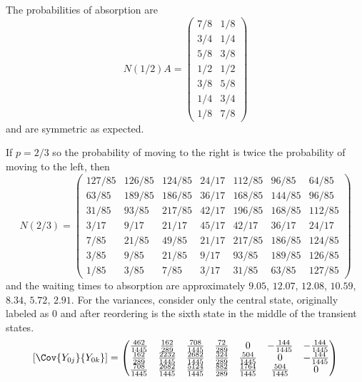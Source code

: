 \documentclass[12pt]{article}
\begin{document}
\begin{example}
    The probabilities of absorption are
    \[
        N(1/2) A =
        \begin{pmatrix}
            7/8 & 1/8\\
            3/4 & 1/4\\
            5/8 & 3/8\\
            1/2 & 1/2\\
            3/8 & 5/8\\
            1/4 & 3/4\\
            1/8 & 7/8
        \end{pmatrix}
    \] and are symmetric as expected.

    If \( p = 2/3 \) so the probability of moving to the right is twice
    the probability of moving to the left, then
    \[
        N(2/3) =
        \begin{pmatrix}
            127/85 & 126/85 & 124/85 & 24/17 & 112/85 & 96/85 & 64/85\\
            63/85 & 189/85 & 186/85 & 36/17 & 168/85 & 144/85 & 96/85\\
            31/85 & 93/85 & 217/85 & 42/17 & 196/85 & 168/85 & 112/85\\
            3/17 & 9/17 & 21/17 & 45/17 & 42/17 & 36/17 & 24/17\\
            7/85 & 21/85 & 49/85 & 21/17 & 217/85 & 186/85 & 124/85\\
            3/85 & 9/85 & 21/85 & 9/17 & 93/85 & 189/85 & 126/85\\
            1/85 & 3/85 & 7/85 & 3/17 & 31/85 & 63/85 & 127/85
        \end{pmatrix}
    \] and the waiting times to absorption are approximately \( 9.05 \),
    \( 12.07 \), \( 12.08 \), \( 10.59 \), \( 8.34 \), \( 5.72 \), \(
    2.91 \).  For the variances, consider only the central state,
    originally labeled as \( 0 \) and after reordering is the sixth
    state in the middle of the transient states.
    \[
        \left[ \Cov{Y_{0j}}{Y_{0k}} \right] =
        \begin{pmatrix}
            \frac{462}{1445} & \frac{162}{289} & \frac{708}{1445} &
            \frac{72}{289} & 0 & -\frac{144}{1445} & -\frac{144}{1445}\\
            \frac{162}{289} & \frac{2232}{1445} & \frac{2682}{1445} &
            \frac{324}{289} & \frac{504}{1445} & 0 & -\frac{144}{1445}\\
            \frac{708}{1445} & \frac{2682}{1445} & \frac{5124}{1445} &
            \frac{882}{289} & \frac{1764}{1445} & \frac{504}{1445} & 0\\

\end{pmatrix}\]
\end{example}
\end{document}
